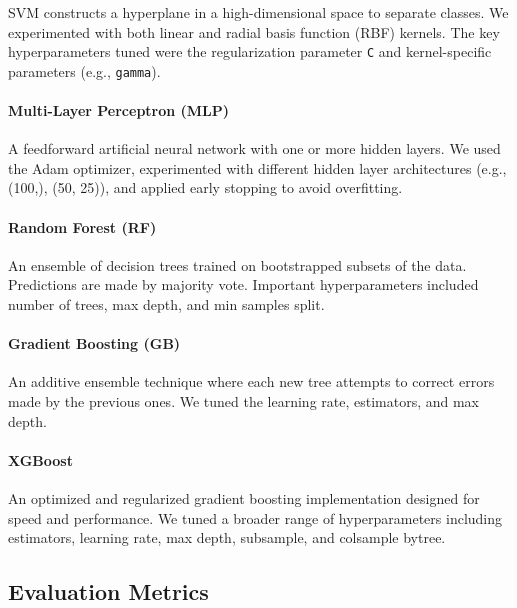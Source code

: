 \documentclass{article}
\begin{document}
SVM constructs a hyperplane in a high-dimensional space to separate classes. We experimented with both linear and radial basis function (RBF) kernels. The key hyperparameters tuned were the regularization parameter \texttt{C} and kernel-specific parameters (e.g., \texttt{gamma}).



\paragraph{Multi-Layer Perceptron (MLP)}

A feedforward artificial neural network with one or more hidden layers. We used the Adam optimizer, experimented with different hidden layer architectures (e.g., (100,), (50, 25)), and applied early stopping to avoid overfitting.



\paragraph{Random Forest (RF)}

An ensemble of decision trees trained on bootstrapped subsets of the data. Predictions are made by majority vote. Important hyperparameters included number of trees, max depth, and min samples split.



\paragraph{Gradient Boosting (GB)}

An additive ensemble technique where each new tree attempts to correct errors made by the previous ones. We tuned the learning rate, estimators, and max depth.



\paragraph{XGBoost}

An optimized and regularized gradient boosting implementation designed for speed and performance. We tuned a broader range of hyperparameters including estimators, learning rate, max depth, subsample, and colsample bytree.



\subsection{Evaluation Metrics}
\end{document}
